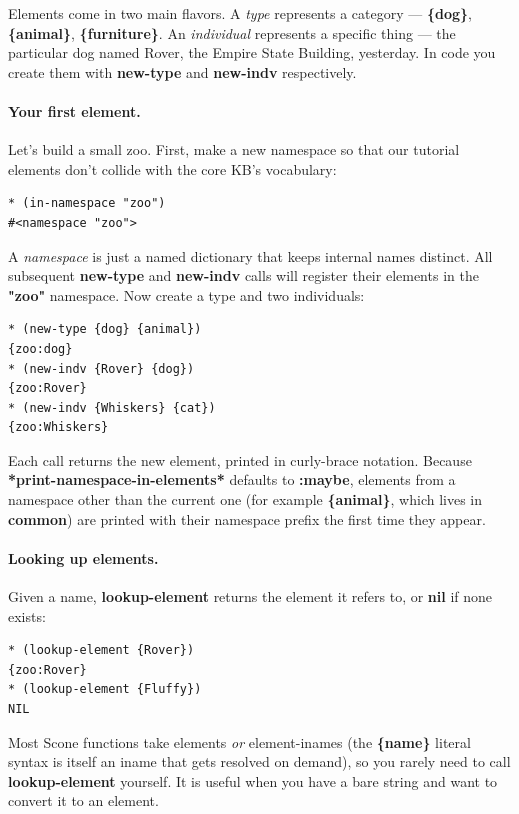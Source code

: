 \documentclass[titlepage,twoside,openright,11pt]{article}
\begin{document}
Elements come in two main flavors. A \emph{type} represents a
category --- \textbf{\{dog\}}, \textbf{\{animal\}},
\textbf{\{furniture\}}. An \emph{individual} represents a specific
thing --- the particular dog named Rover, the Empire State Building,
yesterday. In code you create them with \textbf{new-type} and
\textbf{new-indv} respectively.

\paragraph{Your first element.}
Let's build a small zoo. First, make a new namespace so that our
tutorial elements don't collide with the core KB's vocabulary:

\begin{verbatim}
* (in-namespace "zoo")
#<namespace "zoo">
\end{verbatim}

A \emph{namespace} is just a named dictionary that keeps internal
names distinct. All subsequent \textbf{new-type} and
\textbf{new-indv} calls will register their elements in the
\textbf{"zoo"} namespace. Now create a type and two individuals:

\begin{verbatim}
* (new-type {dog} {animal})
{zoo:dog}
* (new-indv {Rover} {dog})
{zoo:Rover}
* (new-indv {Whiskers} {cat})
{zoo:Whiskers}
\end{verbatim}

Each call returns the new element, printed in curly-brace notation.
Because \textbf{*print-namespace-in-elements*} defaults to
\textbf{:maybe}, elements from a namespace other than the current
one (for example \textbf{\{animal\}}, which lives in
\textbf{common}) are printed with their namespace prefix the first
time they appear.

\paragraph{Looking up elements.}
Given a name, \textbf{lookup-element} returns the element it refers
to, or \textbf{nil} if none exists:

\begin{verbatim}
* (lookup-element {Rover})
{zoo:Rover}
* (lookup-element {Fluffy})
NIL
\end{verbatim}

Most Scone functions take elements \emph{or} element-inames (the
\textbf{\{name\}} literal syntax is itself an iname that gets
resolved on demand), so you rarely need to call
\textbf{lookup-element} yourself. It is useful when you have a
bare string and want to convert it to an element.
\end{document}

